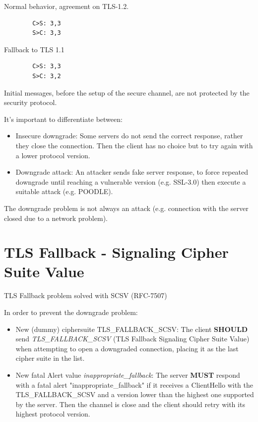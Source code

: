 \begin{multicols}{2}
    \raggedcolumns

    \begin{center}
        Normal behavior, agreement on TLS-1.2.
    \end{center}

    \begin{verbatim}
        C>S: 3,3
        S>C: 3,3
    \end{verbatim}
    \columnbreak

    \begin{center}
        Fallback to TLS 1.1
    \end{center}
    \begin{verbatim}
        C>S: 3,3
        S>C: 3,2
    \end{verbatim}
\end{multicols}
\begin{tcolorbox}[colback=red!10!white, colframe=red!70!black, coltitle=white, title=Beware]
Initial messages, before the setup of the secure channel, are not protected by the security protocol.
\end{tcolorbox}

\noindent It's important to differentiate between:
\begin{itemize}
    \item Insecure downgrade: Some servers do not send the correct response, rather they close the connection. Then the client has no choice but to try again with a lower protocol version.
    \item Downgrade attack: An attacker sends fake server response, to force repeated downgrade until reaching a vulnerable version (e.g. SSL-3.0) then execute a suitable attack (e.g. POODLE).
\end{itemize}
The downgrade problem is not always an attack (e.g. connection with the server closed due to a network problem).

\section{TLS Fallback - Signaling Cipher Suite Value}
\begin{center}
    TLS Fallback problem solved with SCSV (RFC-7507)
\end{center}

\noindent In order to prevent the downgrade problem:
\begin{itemize}
    \item New (dummy) ciphersuite TLS\_FALLBACK\_SCSV: The client \textbf{SHOULD} send \textit{TLS\_FALLBACK\_SCSV} (TLS Fallback Signaling Cipher Suite Value) when attempting to open a downgraded connection, placing it as the last cipher suite in the list.
    \item New fatal Alert value \textit{inappropriate\_fallback}: The server \textbf{MUST} respond with a fatal alert "inappropriate\_fallback" if it receives a ClientHello with the TLS\_FALLBACK\_SCSV and a version lower than the highest one supported by the server. Then the channel is close and the client should retry with its highest protocol version.
\end{itemize}

